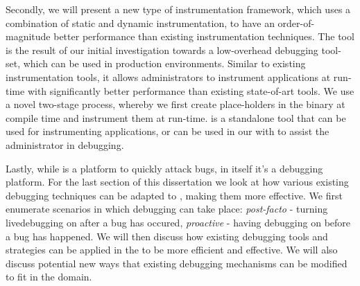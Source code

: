 Secondly, we will present \iprobe a new type of instrumentation framework, which uses a combination of static and dynamic instrumentation, to have an order-of-magnitude better performance than existing instrumentation techniques. 
The \iprobe tool is the result of our initial investigation towards a low-overhead debugging tool-set, which can be used in production environments.
Similar to existing instrumentation tools, it allows administrators to instrument applications at run-time with significantly better performance than existing state-of-art tools.
We use a novel two-stage process, whereby we first create place-holders in the binary at compile time and instrument them at run-time.
\iprobe is a standalone tool that can be used for instrumenting applications, or can be used in our \debugcontainer with \parikshan to assist the administrator in debugging.


\begin{comment}
Thirdly, we will present a mechanism to create overhead budgets for instrumentation in the debug container to make \livedebugging more robust, and longer lasting.
This will be split in two different kinds of techniques: Firstly, we will provide pro-active mechanism to find an instrumentation overhead budget. This is based on queuing theory, simulations, and testing results. 
Secondly: we will provide a reactive mechanism to modify instrumentation overhead. 
We will use the buffer size and usage as a trigger and present novel sampling techniques together with statistical testing mechanism to effectively isolate bugs.
\end{comment}

Lastly, while \parikshan is a platform to quickly attack bugs, in itself it's a debugging platform. 
For the last section of this dissertation we look at how various existing debugging techniques can be adapted to \livedebugging, making them more effective. 
We first enumerate scenarios in which debugging can take place: \emph{post-facto} - turning livedebugging on after a bug has occured, \emph{proactive} - having debugging on before a bug has happened.
We will then discuss how existing debugging tools and strategies can be applied in the \debugcontainer to be more efficient and effective. We will also discuss potential new ways that existing debugging mechanisms can be modified to fit in the \livedebugging domain.


